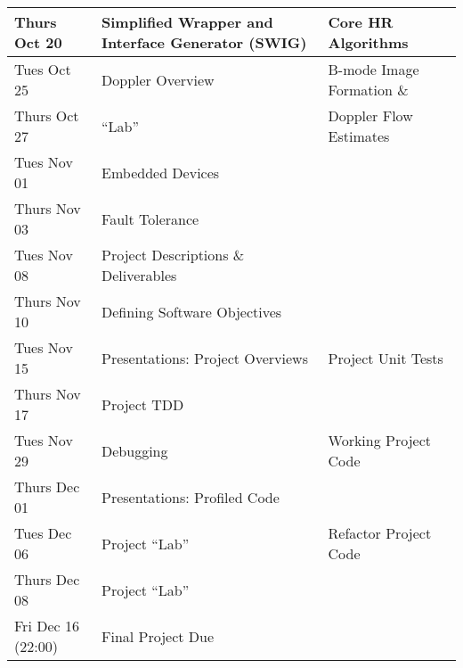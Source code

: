 \begin{longtable}[c]{|l|l|l|}
    Thurs Oct 20    & Simplified Wrapper and Interface Generator (SWIG) & Core HR Algorithms \\
    \hline
    Tues Oct 25     & Doppler Overview & B-mode Image Formation \& \\
    Thurs Oct 27    & ``Lab'' & Doppler Flow Estimates \\
    \hline
    Tues Nov 01     & Embedded Devices & \\
    Thurs Nov 03    & Fault Tolerance & \\
    \hline
    Tues Nov 08     & Project Descriptions \& Deliverables & \\
    Thurs Nov 10    & Defining Software Objectives & \\
    \hline
    Tues Nov 15     & Presentations: Project Overviews  & Project Unit Tests \\
    Thurs Nov 17    & Project TDD & \\
    \hline
    Tues Nov 29     & Debugging & Working Project Code \\
    Thurs Dec 01    & Presentations: Profiled Code & \\
    \hline
    Tues Dec 06     & Project ``Lab'' & Refactor Project Code \\
    Thurs Dec 08    & Project ``Lab'' & \\
    \hline
    Fri Dec 16 (22:00) & Final Project Due  & \\
    \hline

\end{longtable}
